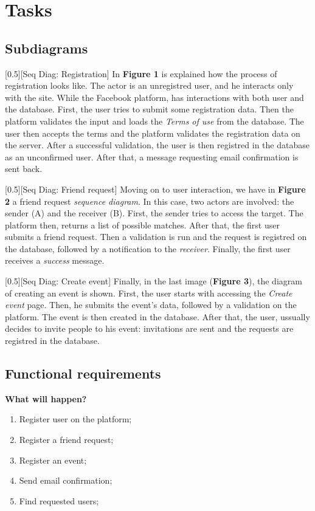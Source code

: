 \documentclass{article}
\begin{document}
	\section{Tasks}
		\subsection{Subdiagrams}

		[0.5][Seq Diag: Registration]
		In \textbf{Figure 1} is explained how the process of registration looks like. The actor is an unregistred user, and he interacts only with the site. While the Facebook platform, has interactions with both user and the database. First, the user tries to submit some registration data. Then the platform validates the input and loads the \textit{Terms of use} from the database. The user then accepts the terms and the platform validates the registration data on the server. After a successful validation, the user is then registred in the database as an unconfirmed user. After that, a message requesting email confirmation is sent back.
		
		[0.5][Seq Diag: Friend request]
		Moving on to user interaction, we have in \textbf{Figure 2} a friend request \textit{sequence diagram}. In this case, two actors are involved: the sender (A) and the receiver (B). First, the sender tries to access the target. The platform then, returns a list of possible matches. After that, the first user submits a friend request. Then a validation is run and the request is registred on the database, followed by a notification to the \textit{receiver}. Finally, the first user receives a \textit{success} message.

		[0.5][Seq Diag: Create event]
		Finally, in the last image (\textbf{Figure 3}), the diagram of creating an event is shown. First, the user starts with accessing the \textit{Create event} page. Then, he submits the event's data, followed by a validation on the platform. The event is then created in the database. After that, the user, ussually decides to invite people to his event: invitations are sent and the requests are registred in the database.

		\subsection{Functional requirements}
		\textbf{What will happen?}
		\begin{enumerate}
			\item Register user on the platform;
			\item Register a friend request;
			\item Register an event;
			\item Send email confirmation;
			\item Find requested users;
		\end{enumerate}
\end{document}
